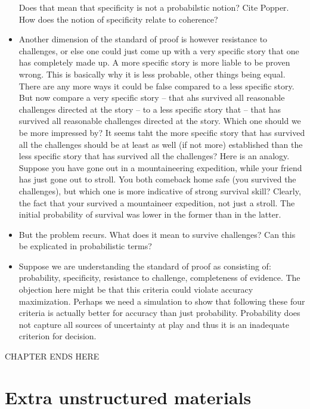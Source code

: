 \documentclass[
  10pt,
  dvipsnames,enabledeprecatedfontcommands]{scrartcl}
\begin{document}
\begin{itemize}
  Does that mean that specificity is not a probabilstic notion? Cite
  Popper. How does the notion of specificity relate to coherence?
\item
  Another dimension of the standard of proof is however resistance to
  challenges, or else one could just come up with a very specific story
  that one has completely made up. A more specific story is more liable
  to be proven wrong. This is basically why it is less probable, other
  things being equal. There are any more ways it could be false compared
  to a less specific story. But now compare a very specific story --
  that ahs survived all reasonable challenges directed at the story --
  to a less specific story that -- that has survived all reasonable
  challenges directed at the story. Which one should we be more
  impressed by? It seems taht the more specific story that has survived
  all the challenges should be at least as well (if not more)
  established than the less specific story that has survived all the
  challenges? Here is an analogy. Suppose you have gone out in a
  mountaineering expedition, while your friend has just gone out to
  stroll. You both comeback home safe (you survived the challenges), but
  which one is more indicative of strong survival skill? Clearly, the
  fact that your survived a mountaineer expedition, not just a stroll.
  The initial probability of survival was lower in the former than in
  the latter.
\item
  But the problem recurs. What does it mean to survive challenges? Can
  this be explicated in probabilistic terms?
\item
  Suppose we are understanding the standard of proof as consisting of:
  probability, specificity, resistance to challenge, completeness of
  evidence. The objection here might be that this criteria could violate
  accuracy maximization. Perhaps we need a simulation to show that
  following these four criteria is actually better for accuracy than
  just probability. Probability does not capture all sources of
  uncertainty at play and thus it is an inadequate criterion for
  decision.
\end{itemize}

\noindent\makebox[\linewidth]{\rule{\paperwidth}{1pt}}

CHAPTER ENDS HERE

\noindent\makebox[\linewidth]{\rule{\paperwidth}{1pt}}

\hypertarget{extra-unstructured-materials}{%
\section{Extra unstructured
materials}\label{extra-unstructured-materials}}
\end{document}

